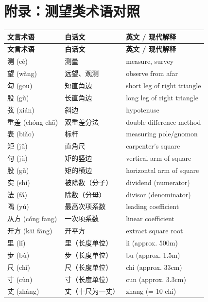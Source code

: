 \documentclass[11pt,a4paper]{article}
\begin{document}
\newpage

\section*{附录：测望类术语对照}

\begin{center}
\begin{longtable}{|p{3.5cm}|p{4cm}|p{6cm}|}
\hline
\rowcolor{sectioncolor!20}
\textbf{文言术语} & \textbf{白话文} & \textbf{英文 / 现代解释} \\
\hline
\endfirsthead
\hline
\rowcolor{sectioncolor!20}
\textbf{文言术语} & \textbf{白话文} & \textbf{英文 / 现代解释} \\
\hline
\endhead
\hline
\endfoot

测 (cè) & 测量 & measure, survey \\
\hline
望 (wàng) & 远望、观测 & observe from afar \\
\hline
勾 (gōu) & 短直角边 & short leg of right triangle \\
\hline
股 (gǔ) & 长直角边 & long leg of right triangle \\
\hline
弦 (xián) & 斜边 & hypotenuse \\
\hline
重差 (chóng chā) & 双重差分法 & double-difference method \\
\hline
表 (biǎo) & 标杆 & measuring pole/gnomon \\
\hline
矩 (jǔ) & 直角尺 & carpenter's square \\
\hline
句 (jù) & 矩的竖边 & vertical arm of square \\
\hline
股 (gǔ) & 矩的横边 & horizontal arm of square \\
\hline
实 (shí) & 被除数（分子） & dividend (numerator) \\
\hline
法 (fǎ) & 除数（分母） & divisor (denominator) \\
\hline
隅 (yú) & 最高次项系数 & leading coefficient \\
\hline
从方 (cóng fāng) & 一次项系数 & linear coefficient \\
\hline
开方 (kāi fāng) & 开平方 & extract square root \\
\hline
里 (lǐ) & 里（长度单位） & li (approx. 500m) \\
\hline
步 (bù) & 步（长度单位） & bu (approx. 1.5m) \\
\hline
尺 (chǐ) & 尺（长度单位） & chi (approx. 33cm) \\
\hline
寸 (cùn) & 寸（长度单位） & cun (approx. 3.3cm) \\
\hline
丈 (zhàng) & 丈（十尺为一丈） & zhang (= 10 chi) \\
\hline
\end{longtable}
\end{center}
\end{document}
